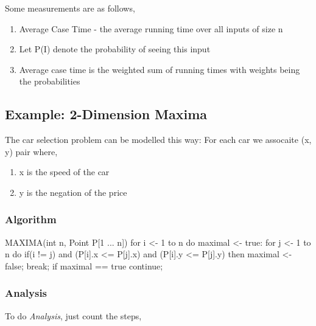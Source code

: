\documentclass{article}
\begin{document}
    Some measurements are as follows,

    \begin{enumerate}
        \item Average Case Time - the average running time over all inputs of size n
        \item Let P(I) denote the probability of seeing this input
        \item Average case time is the weighted sum of running times with weights being the probabilities
    \end{enumerate}

    \subsection{Example: 2-Dimension Maxima}

    The car selection problem can be modelled this way: For each car we assocaite (x, y) pair where,

    \begin{enumerate}
        \item x is the speed of the car
        \item y is the negation of the price
    \end{enumerate}

    \subsubsection{Algorithm}

    MAXIMA(int n, Point P[1 ... n])
        for i <- 1 to n
        do maximal <- true:
            for j <- 1 to n
            do
                if(i != j) and  (P[i].x <= P[j].x) and (P[i].y <= P[j].y)
                    then maximal <- false;
                    break;
                if maximal == true
                    continue;

    \subsubsection{Analysis}

    To do \textit{Analysis}, just count the steps, 
\end{document}
